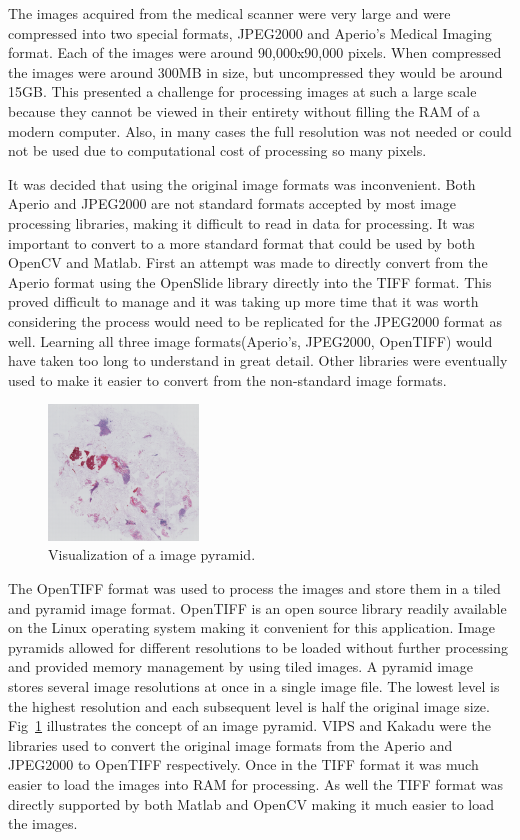 \documentclass[letterpaper,10pt,oneside]{article}
\begin{document}
The images acquired from the medical scanner were very large and were compressed into two special formats, JPEG2000 and Aperio's Medical Imaging format. Each of the images were around 90,000x90,000 pixels. When compressed the images were around 300MB in size, but uncompressed they would be around 15GB. This presented a challenge for processing images at such a large scale because they cannot be viewed in their entirety without filling the RAM of a modern computer. Also, in many cases the full resolution was not needed or could not be used due to computational cost of processing so many pixels.

It was decided that using the original image formats was inconvenient. Both Aperio and JPEG2000 are not standard formats accepted by most image processing libraries, making it difficult to read in data for processing. It was important to convert to a more standard format that could be used by both OpenCV and Matlab. First an attempt was made to directly convert from the Aperio format using the OpenSlide library directly into the TIFF format. This proved difficult to manage and it was taking up more time that it was worth considering the process would need to be replicated for the JPEG2000 format as well. Learning all three image formats(Aperio's, JPEG2000, OpenTIFF) would have taken too long to understand in great detail. Other libraries were eventually used to make it easier to convert from the non-standard image formats.

\begin{figure}[hbtp]
  \centering
  \includegraphics[width=4cm]{images/PO13-00516A1_1_7_201305171148.png}
  \caption{Visualization of a image pyramid.}
  \label{fig:imagepyramid}
\end{figure}

The OpenTIFF format was used to process the images and store them in a tiled and pyramid image format. OpenTIFF is an open source library readily available on the Linux operating system making it convenient for this application. Image pyramids allowed for different resolutions to be loaded without further processing and provided memory management by using tiled images. A pyramid image stores several image resolutions at once in a single image file. The lowest level is the highest resolution and each subsequent level is half the original image size. Fig~\ref{fig:imagepyramid} illustrates the concept of an image pyramid. VIPS and Kakadu were the libraries used to convert the original image formats from the Aperio and JPEG2000 to OpenTIFF respectively. Once in the TIFF format it was much easier to load the images into RAM for processing. As well the TIFF format was directly supported by both Matlab and OpenCV making it much easier to load the images.
\end{document}
